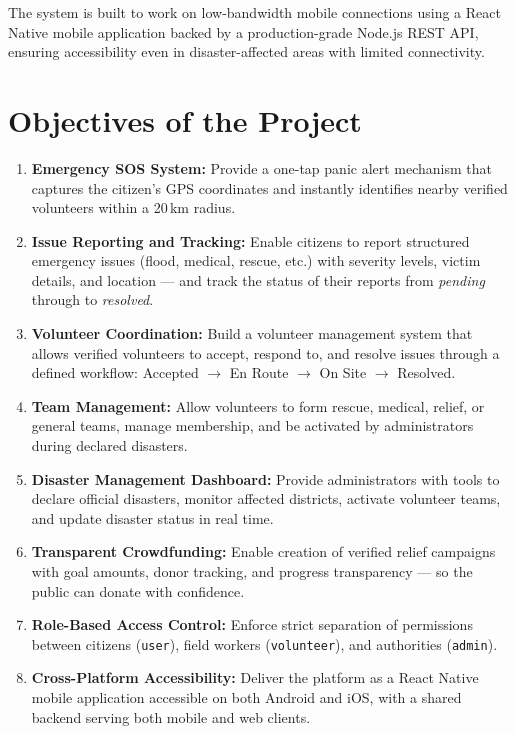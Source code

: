 \documentclass[12pt,a4paper]{article}
\begin{document}
The system is built to work on low-bandwidth mobile connections using a
React Native mobile application backed by a production-grade Node.js REST API,
ensuring accessibility even in disaster-affected areas with limited connectivity.

\section{Objectives of the Project}

\begin{enumerate}[leftmargin=*, label=\textbf{\arabic*.}, itemsep=4pt]
  \item \textbf{Emergency SOS System:} Provide a one-tap panic alert mechanism
        that captures the citizen's GPS coordinates and instantly identifies nearby
        verified volunteers within a 20\,km radius.

  \item \textbf{Issue Reporting and Tracking:} Enable citizens to report structured
        emergency issues (flood, medical, rescue, etc.) with severity levels, victim
        details, and location --- and track the status of their reports from
        \textit{pending} through to \textit{resolved}.

  \item \textbf{Volunteer Coordination:} Build a volunteer management system that
        allows verified volunteers to accept, respond to, and resolve issues through
        a defined workflow: Accepted $\rightarrow$ En Route $\rightarrow$ On Site
        $\rightarrow$ Resolved.

  \item \textbf{Team Management:} Allow volunteers to form rescue, medical, relief,
        or general teams, manage membership, and be activated by administrators
        during declared disasters.

  \item \textbf{Disaster Management Dashboard:} Provide administrators with tools
        to declare official disasters, monitor affected districts, activate volunteer
        teams, and update disaster status in real time.

  \item \textbf{Transparent Crowdfunding:} Enable creation of verified relief
        campaigns with goal amounts, donor tracking, and progress transparency ---
        so the public can donate with confidence.

  \item \textbf{Role-Based Access Control:} Enforce strict separation of
        permissions between citizens (\texttt{user}), field workers
        (\texttt{volunteer}), and authorities (\texttt{admin}).

  \item \textbf{Cross-Platform Accessibility:} Deliver the platform as a
        React Native mobile application accessible on both Android and iOS,
        with a shared backend serving both mobile and web clients.
\end{enumerate}
\end{document}

